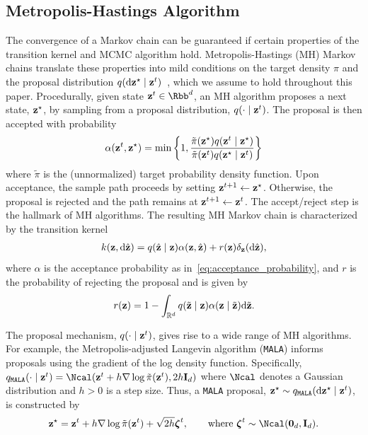 \documentclass[onefignum,onetabnum]{siamonline250211}
\renewcommand{\d} {{\rm d}}                                %
\newcommand{\bfzeta}{{\boldsymbol{\zeta}}}
\newcommand{\bfI}{{\bf I}}
\newcommand{\bfz}{{\bf z}}
\newcommand{\bbR}{\mathbb{R}}
\newcommand{\MALA}{\textnormal{\texttt{MALA}}\xspace}
\begin{document}
\subsection{Metropolis-Hastings Algorithm}
\label{sec:metropolis_hastings_mixing_times}
%
The convergence of a Markov chain can be guaranteed if  certain properties of the transition kernel and MCMC algorithm hold.
%
Metropolis-Hastings (MH) Markov chains \cite{metropolis_equation_1953, hastings_monte_1970} translate these properties into mild conditions on the target density $\pi$ and the proposal distribution $q(\d\bfz^\star\mid\bfz^t)$~\cite[Corollary~7.5 and 7.7]{robert_monte_2004}, which we assume to hold throughout this paper.
%
Procedurally, given state $\bfz^t\in \Rbb^d$, an MH algorithm proposes a next state, $\bfz^\star$, by sampling from a proposal distribution, $q(\cdot \mid \bfz^t)$. 
%
%
%
%
%
The proposal is then accepted with probability
%
    \begin{align}\label{eq:acceptance_probability}
        \alpha(\bfz^t, {\bfz}^\star) = \min \left\{1, \frac{\tilde{\pi}({\bfz}^\star)q(\bfz^t \mid {\bfz}^\star)}{\tilde{\pi}(\bfz^t)q({\bfz}^\star \mid \bfz^t)  }\right\}
    \end{align}
where $\tilde{\pi}$ is the (unnormalized) target probability density function. 
Upon acceptance, the sample path proceeds by setting $\bfz^{t+1} \gets {\bfz}^\star$.
Otherwise, the proposal is rejected and the path remains at $\bfz^{t+1} \gets \bfz^t$. 
The accept/reject step is the hallmark of MH algorithms. 
%
%
%
%
%
%
%
%
The resulting MH Markov chain is characterized by the transition kernel
\begin{align}
    \label{eq:MH_transition_kernel}
    k(\bfz,\d\hat\bfz)=q(\hat\bfz\mid\bfz)\alpha(\bfz,\hat\bfz)+r(\bfz)\delta_{\bfz}(\d\hat\bfz),
\end{align}
where $\alpha$ is the acceptance probability as in~\eqref{eq:acceptance_probability}, and $r$ is the probability of rejecting the proposal and is given by
\begin{align}
\label{eq:rejection_probability}
    r(\bfz)=1-\int_{\bbR^{d}} q(\tilde\bfz\mid\bfz)\alpha(\bfz\mid\tilde\bfz)\d\tilde\bfz.
\end{align}

The proposal mechanism, $q(\cdot \mid \bfz^t)$, gives rise to a wide range of MH algorithms.
For example, the Metropolis-adjusted Langevin algorithm (\MALA) informs proposals using the gradient of the log density function. 
Specifically,  $q_{\MALA}(\cdot \mid \bfz^t) = \Ncal(\bfz^t + h \nabla \log \tilde{\pi}(\bfz^t), 2 h \bfI_d)$ where $\Ncal$ denotes a Gaussian distribution and $h > 0$ is a step size. 
Thus, a \MALA proposal, $\bfz^\star \sim q_{\MALA}(\d\bfz^\star \mid \bfz^t)$, is constructed by
    \begin{align}\label{eq:mala_proposal}
        \bfz^\star = \bfz^t + h \nabla \log \tilde{\pi}(\bfz^t) + \sqrt{2h}\bfzeta^t, \qquad \text{where $\bfzeta^t\sim \Ncal({\bf0}_d, \bfI_d)$.}
    \end{align}
%
\end{document}
